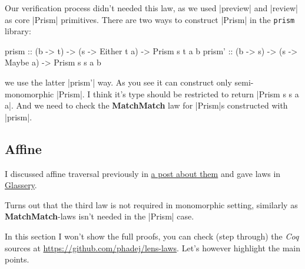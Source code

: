 \documentclass{article}
\begin{document}
Our verification process didn't needed this law, as we used |preview| and |review|
as core |Prism| primitives.
There are two ways to construct |Prism| in the \texttt{prism} library:

\begin{code}
prism  :: (b -> t) -> (s -> Either t a) -> Prism s t a b
prism' :: (b -> s) -> (s -> Maybe    a) -> Prism s s a b
\end{code}

we use the latter |prism'| way. As you see it can construct only semi-monomorphic
|Prism|. I think it's type should be restricted to return |Prism s s a a|.
And we need to check the \textbf{MatchMatch} law for |Prism|s constructed with
|prism|.

\subsection{Affine}

 I discussed affine traversal previously in
\href{2017-03-20-affine-traversal.html}{a post about them}
and gave laws in
\href{2017-04-18-glassery.html#laws:affine-traversal}{Glassery}.


Turns out that the third law is not required in monomorphic setting,
similarly as \textbf{MatchMatch}-laws isn't needed in the |Prism| case.

In this section I won't show the full proofs, you can check (step through) the
\emph{Coq} sources at \url{https://github.com/phadej/lens-laws}. Let's however
highlight the main points.
\end{document}
